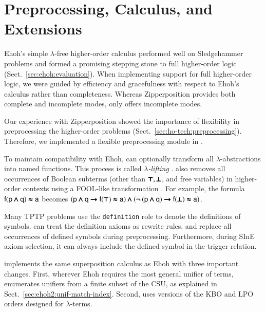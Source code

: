   \section{Preprocessing, Calculus, and Extensions}
  \label{sec:ehoh2:calculus}
  
  Ehoh's simple $\lambda$-free higher-order calculus performed well on
  Sledgehammer problems and formed a promising stepping stone to full higher-order
  logic (Sect.~\ref{sec:ehoh:evaluation}). When implementing support for full higher-order
  logic, we were guided by efficiency and gracefulness with respect to Ehoh's calculus rather
  than completeness. Whereas Zipperposition provides both complete and incomplete
  modes, \ehohii{} only offers incomplete modes.
  
   Our experience with Zipperposition showed the importance
  of flexibility in preprocessing the higher-order problems
  (Sect.~\ref{sec:ho-tech:preprocessing}). Therefore, we implemented a flexible
  preprocessing module in \ehohii{}. 
  
  To maintain compatibility with Ehoh, \ehohii{} can optionally transform all
  $\lambda$-abstractions into named functions. This process is called
  \emph{$\lambda$-lifting} \cite{rjmh-82-lifting}. \ehohii{} also removes all
  occurrences of Boolean subterms (other than $\pmb{\top}, \pmb{\bot}$, and free variables)
  in higher-order contexts using a FOOL-like transformation \cite{kotelnikov-16-fool}.
  For example, the formula $\mathsf{f}(\mathsf{p} \pmb{\land} \mathsf{q}) \pmb{\approx} \mathsf{a}$ becomes
  $(\mathsf{p} \pmb{\land} \mathsf{q} \pmb{\rightarrow} \mathsf{f}(\pmb{\top}) \pmb{\approx} \mathsf{a}) \pmb{\land}
  (\pmb{\neg\,}(\mathsf{p} \pmb{\land} \mathsf{q}) \pmb{\rightarrow} \mathsf{f}(\pmb{\bot}) \pmb{\approx} \mathsf{a})$.
  
  Many TPTP problems use the \texttt{definition} role to denote the definitions of
  symbols. \ehohii{} can treat the definition axioms as rewrite rules, and replace
  all occurrences of defined symbols during preprocessing. Furthermore, during
  SInE \cite{hv-2011-sine} axiom selection, it can always
  include the defined symbol in the trigger relation.
  
   \ehohii{} implements the same superposition
  calculus as Ehoh with three important changes. First, wherever Ehoh requires
  the most general unifier of terms, \ehohii{} enumerates unifiers from a finite subset of the CSU, as explained in
  Sect.~\ref{sec:ehoh2:unif-match-index}. Second, \ehohii{} uses versions of the KBO and
  LPO orders designed for $\lambda$-terms.
  
